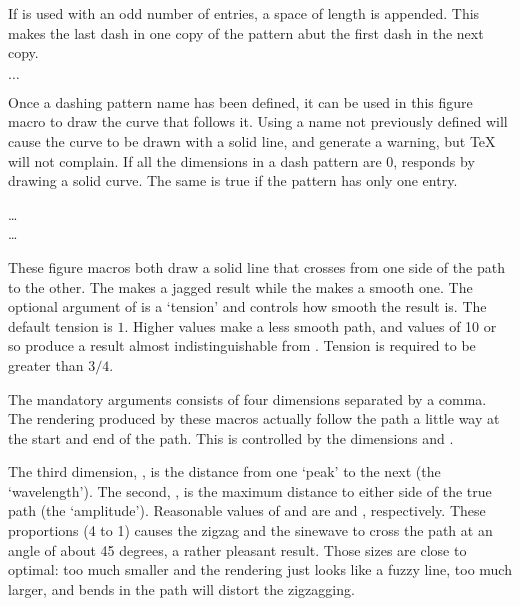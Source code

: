 \documentclass[letterpaper]{article}
\begin{document}
If  is used with an odd number of entries, a space of
length \dim{0pt} is appended. This makes the last dash in one copy of
the pattern abut the first dash in the next copy.

\begin{cd}
$\ldots$%
\end{cd}

Once a dashing pattern name has been defined, it can be used in this
figure macro to draw the curve that follows it. Using a name not
previously defined will cause the curve to be drawn with a solid line,
and generate a \MF{} warning, but \TeX{} will not complain. If all the
dimensions in a dash pattern are 0,  responds by drawing a
solid curve. The same is true if the pattern has only one entry.

\begin{cd}
\dots\\
%
    \dots%
%
\end{cd}

These figure macros both draw a solid line that crosses from one
side of the path to the other. The  makes a jagged result
while the  makes a smooth one. The optional argument of
 is a `tension' and controls how smooth the result is. The
default tension is $1$. Higher values make a less smooth path, and
values of 10 or so produce a result almost indistinguishable from
. Tension is required to be greater than $3/4$.

The mandatory arguments consists of four dimensions separated by a comma.
The rendering produced by these macros actually follow the path a little
way at the start and end of the path. This is controlled by the
dimensions  and .

The third dimension, , is the distance from one `peak' to the
next (the `wavelength'). The second, , is the maximum distance
to either side of the true path (the `amplitude'). Reasonable values of
 and  are \dim{8pt} and \dim{2pt}, respectively.
These proportions (4 to 1) causes the zigzag and the sinewave to cross
the path at an angle of about 45 degrees, a rather pleasant result.
Those sizes are close to optimal: too much smaller and the rendering
just looks like a fuzzy line, too much larger, and bends in the path
will distort the zigzagging.
\end{document}
